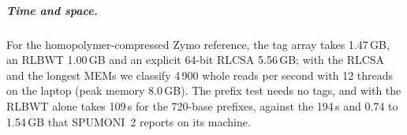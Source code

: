 \subparagraph*{Time and space.}
For the homopolymer-compressed Zymo reference, the tag array takes 1.47\,GB, an RLBWT 1.00\,GB and an explicit 64-bit RLCSA 5.56\,GB; with the RLCSA and the longest MEMs we classify 4\,900 whole reads per second with 12 threads on the laptop (peak memory 8.0\,GB).
The prefix test needs no tags, and with the RLBWT alone takes 109\,s for the 720-base prefixes, against the 194\,s and 0.74 to 1.54\,GB that SPUMONI~2 reports on its machine.
